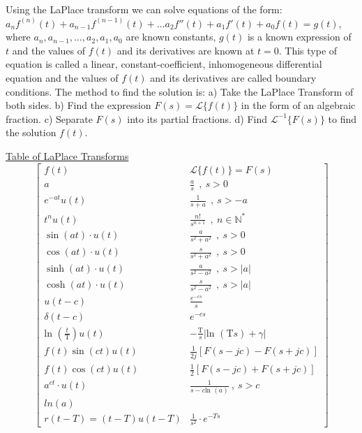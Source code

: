 \documentclass[12pt]{article}
\def\ln{\text{ln\ }} %
\newcommand{\Tau}{\mathrm{T}} %
\begin{document}
\begin{flushleft}
	\textbullet \quad Using the LaPlace transform we can solve equations of the form: $\displaystyle a_n f^{(n)} (t) + a_{n-1} f^{(n-1)} (t) + \ldots a_2 f''(t) + a_1 f'(t) + a_0 f(t) = g(t) $, where $\displaystyle a_n, a_{n-1}, \ldots, a_2, a_1, a_0$ are known constants, $g(t)$ is a known expression of $t$ and the values of $f(t)$ and its derivatives are known at $t=0$. \linebreak 
	This type of equation is called a linear, constant-coefficient, inhomogeneous differential equation and the values of $f(t)$ and its derivatives are called boundary conditions. The method to find the solution is: \linebreak 
	a) Take the LaPlace Transform of both sides. \linebreak 
	b) Find the expression $\displaystyle F(s) = \mathcal{L} \{ f(t) \} $ in the form of an algebraic fraction. \linebreak 
	c) Separate $F(s)$ into its partial fractions. \linebreak 
	d) Find $\displaystyle \mathcal{L}^{-1} \{ F(s) \}$ to find the solution $f(t)$. \linebreak 
	
	\uline{Table of LaPlace Transforms} \linebreak 
	$$ \begin{bmatrix}
	f(t) & \mathcal{L} \{ f(t) \} = F(s) \\ 
	a & \frac{a}{s} \ \ , \ s>0 \\
	e^{-at} u(t) & \frac{1}{s+a} \ \ , \ s > -a \\ 
	t^n u(t) & \frac{n!}{s^{n+1}} \ \ , \ n\in \mathbb{N}^* \\ 
	\sin (at) \cdot u(t) & \frac{a}{s^2 + a^2} \ \ , \ s> 0 \\ 
	\cos (at) \cdot u(t) & \frac{s}{s^2 +a^2} \ \ , \ s>0 \\
	\sinh (at) \cdot u(t) & \frac{a}{s^2-a^2} \ \ , \ s> |a| \\ 
	\cosh (at) \cdot u(t) & \frac{s}{s^2-a^2} \ \ , \ s> |a| \\ 
	u(t-c) & \frac{e^{-cs}}{s} \\ 
	\delta(t-c) & e^{-cs} \\ 
	\ln \left(\frac{t}{\Tau} \right) u(t) & -\frac{\Tau}{s} \big| \ln (\Tau s) + \gamma \big| \\ 
	f(t) \sin (ct) u(t) & \frac{1}{2j} \left[ F(s-jc) - F(s+jc) \right] \\ 
	f(t) \cos (ct) u(t) & \frac{1}{2} \left[ F(s-jc) + F(s+jc) \right] \\ 
	a^{ct} \cdot u(t) & \frac{1}{s-c \ln(a)} \ , \ s>c\\ln(a) \\ 
	r(t-T) = (t-T) u(t-T) & \frac{1}{s^2} \cdot e^{-Ts} 
	\end{bmatrix} $$
	\linebreak 
	

\end{flushleft}
\end{document}
